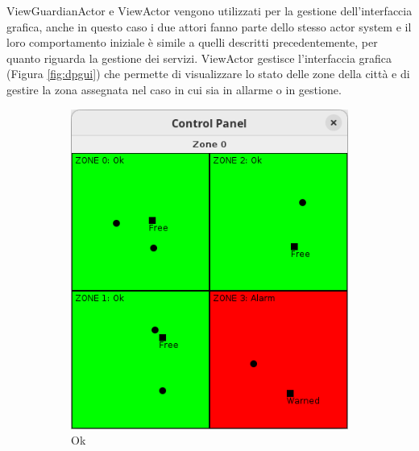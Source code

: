 \documentclass[12pt,a4paper,openright,twoside]{book}
\begin{document}
ViewGuardianActor e ViewActor vengono utilizzati per la gestione dell'interfaccia grafica, anche in questo caso i due attori fanno parte dello stesso actor system e il loro comportamento iniziale è simile a quelli descritti precedentemente, per quanto riguarda la gestione dei servizi.
ViewActor gestisce l'interfaccia grafica (Figura \ref{fig:dpgui}) che permette di visualizzare lo stato delle zone della città e di gestire la zona assegnata nel caso in cui sia in allarme o in gestione.
\begin{figure}
     \centering
     \begin{subfigure}[b]{0.3\textwidth}
         \centering
         \includegraphics[width=\textwidth]{figures/distributed-programming-gui-ok.png}
         \caption{Ok}
         \label{fig:dpguia}
     \end{subfigure}
     \hfill
     \begin{subfigure}[b]{0.3\textwidth}
         \centering

\end{subfigure}
\end{figure}
\end{document}
